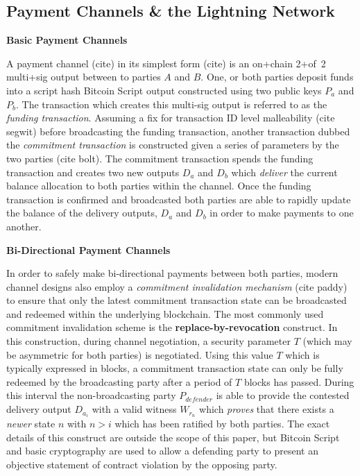 \documentclass[12pt,a4paper]{article}
\theoremstyle{definition}
\begin{document}
\subsection{Payment Channels \& the Lightning Network}

\begin{center}
\textbf{Basic Payment Channels}
\end{center}

A payment channel (cite) in its simplest form (cite) is an on+chain 2+of~2
multi+sig output between to parties $A$ and $B$. One, or both parties deposit
funds into a script hash Bitcoin Script output constructed using two public
keys $P_{a}$ and $P_{b}$. The transaction which creates this multi-sig output
is referred to as the \emph{funding transaction}. Assuming a fix for
transaction ID level malleability (cite segwit) before broadcasting the funding
transaction, another transaction dubbed the \emph{commitment transaction} is
constructed given a series of parameters by the two parties (cite bolt). The
commitment transaction spends the funding transaction and creates two new
outputs $D_{a}$ and $D_{b}$ which \emph{deliver} the current balance allocation
to both parties within the channel. Once the funding transaction is confirmed
and broadcasted both parties are able to rapidly update the balance of the
delivery outputs, $D_{a}$ and $D_{b}$ in order to make payments to one another. \\

\begin{center}
\textbf{Bi-Directional Payment Channels}
\end{center}

In order to safely make bi-directional payments between both parties, modern
channel designs also employ a \emph{commitment invalidation mechanism} (cite
paddy) to ensure that only the latest commitment transaction state can be
broadcasted and redeemed within the underlying blockchain. The most commonly
used commitment invalidation scheme is the \textbf{replace-by-revocation}
construct. In this construction, during channel negotiation, a security
parameter $T$ (which may be asymmetric for both parties) is negotiated. Using
this value $T$ which is typically expressed in blocks, a commitment transaction
state can only be fully redeemed by the broadcasting party after a period of
$T$ blocks has passed. During this interval the non-broadcasting party
$P_{defender}$ is able to provide the contested delivery output $D_{a_i}$ with
a valid witness $W_{r_n}$ which \emph{proves} that there exists a  \emph{newer}
state $n$ with $n > i$ which has been ratified by both parties. The exact
details of this construct are outside the scope of this paper, but Bitcoin
Script and basic cryptography are used to allow a defending party to present an
objective statement of contract violation by the opposing party. \\
\end{document}
